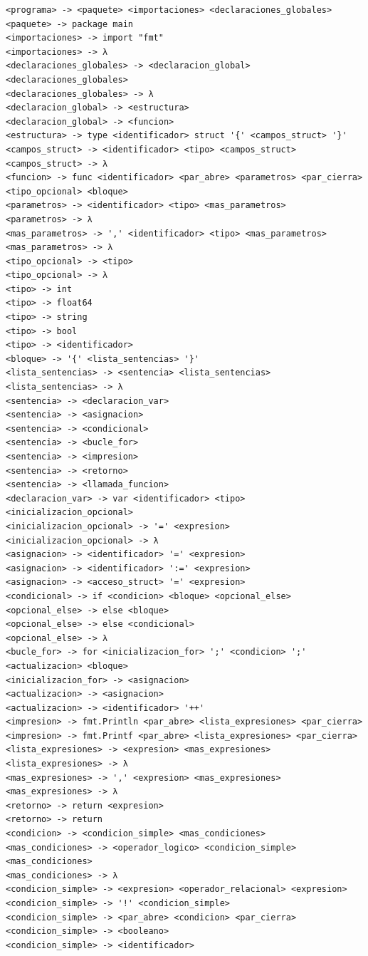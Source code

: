 \documentclass[11pt, a4paper]{article}
\begin{document}
\begin{lstlisting}[style=gramatica]
<programa> -> <paquete> <importaciones> <declaraciones_globales>
<paquete> -> package main
<importaciones> -> import "fmt"
<importaciones> -> λ
<declaraciones_globales> -> <declaracion_global> <declaraciones_globales>
<declaraciones_globales> -> λ
<declaracion_global> -> <estructura>
<declaracion_global> -> <funcion>
<estructura> -> type <identificador> struct '{' <campos_struct> '}'
<campos_struct> -> <identificador> <tipo> <campos_struct>
<campos_struct> -> λ
<funcion> -> func <identificador> <par_abre> <parametros> <par_cierra> <tipo_opcional> <bloque>
<parametros> -> <identificador> <tipo> <mas_parametros>
<parametros> -> λ
<mas_parametros> -> ',' <identificador> <tipo> <mas_parametros>
<mas_parametros> -> λ
<tipo_opcional> -> <tipo>
<tipo_opcional> -> λ
<tipo> -> int
<tipo> -> float64
<tipo> -> string
<tipo> -> bool
<tipo> -> <identificador>
<bloque> -> '{' <lista_sentencias> '}'
<lista_sentencias> -> <sentencia> <lista_sentencias>
<lista_sentencias> -> λ
<sentencia> -> <declaracion_var>
<sentencia> -> <asignacion>
<sentencia> -> <condicional>
<sentencia> -> <bucle_for>
<sentencia> -> <impresion>
<sentencia> -> <retorno>
<sentencia> -> <llamada_funcion>
<declaracion_var> -> var <identificador> <tipo> <inicializacion_opcional>
<inicializacion_opcional> -> '=' <expresion>
<inicializacion_opcional> -> λ
<asignacion> -> <identificador> '=' <expresion>
<asignacion> -> <identificador> ':=' <expresion>
<asignacion> -> <acceso_struct> '=' <expresion>
<condicional> -> if <condicion> <bloque> <opcional_else>
<opcional_else> -> else <bloque>
<opcional_else> -> else <condicional>
<opcional_else> -> λ
<bucle_for> -> for <inicializacion_for> ';' <condicion> ';' <actualizacion> <bloque>
<inicializacion_for> -> <asignacion>
<actualizacion> -> <asignacion>
<actualizacion> -> <identificador> '++'
<impresion> -> fmt.Println <par_abre> <lista_expresiones> <par_cierra>
<impresion> -> fmt.Printf <par_abre> <lista_expresiones> <par_cierra>
<lista_expresiones> -> <expresion> <mas_expresiones>
<lista_expresiones> -> λ
<mas_expresiones> -> ',' <expresion> <mas_expresiones>
<mas_expresiones> -> λ
<retorno> -> return <expresion>
<retorno> -> return
<condicion> -> <condicion_simple> <mas_condiciones>
<mas_condiciones> -> <operador_logico> <condicion_simple> <mas_condiciones>
<mas_condiciones> -> λ
<condicion_simple> -> <expresion> <operador_relacional> <expresion>
<condicion_simple> -> '!' <condicion_simple>
<condicion_simple> -> <par_abre> <condicion> <par_cierra>
<condicion_simple> -> <booleano>
<condicion_simple> -> <identificador>

\end{lstlisting}
\end{document}
